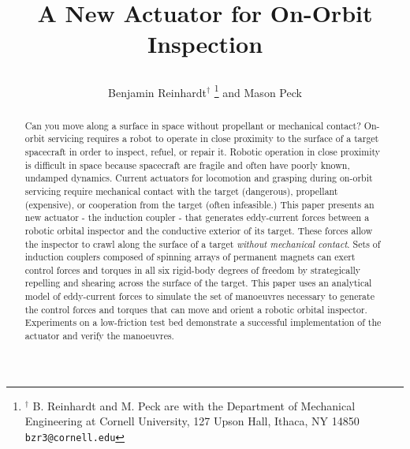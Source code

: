 \documentclass[letterpaper, 10 pt, conference]{ieeeconf}  %
\title{\LARGE \bf



A New Actuator for On-Orbit Inspection 

}
\author{Benjamin Reinhardt$^{\dag}$ 
\thanks{$^{\dag}$ B. Reinhardt and M. Peck are with the Department of Mechanical Engineering at Cornell University, 127 Upson Hall, Ithaca, NY 14850 {\tt\small bzr3@cornell.edu}}%
and Mason Peck%
}
\begin{document}
\maketitle
\thispagestyle{empty}
\pagestyle{empty}


\begin{abstract}

Can you move along a surface in space without propellant or mechanical contact? On-orbit servicing requires a robot to operate in close proximity to the surface of a target spacecraft in order to inspect, refuel, or repair it.  Robotic operation in close proximity is difficult in space because spacecraft are fragile and often have poorly known, undamped dynamics. Current actuators for locomotion and grasping during on-orbit servicing require mechanical contact with the target (dangerous), propellant (expensive), or cooperation from the target (often infeasible.)   
%
This paper presents an new actuator - the induction coupler - that generates eddy-current forces between a robotic orbital inspector and the conductive exterior of its target. These forces allow the inspector to crawl along the surface of a target \textit{without mechanical contact}. Sets of induction couplers composed of spinning arrays of permanent magnets can exert control forces and torques in all six rigid-body degrees of freedom by strategically repelling and shearing across the surface of the target. 
%
This paper uses an analytical model of eddy-current forces to simulate the set of manoeuvres necessary to generate the control forces and torques that can move and orient a robotic orbital inspector. Experiments on a low-friction test bed demonstrate a successful implementation of the actuator and verify the manoeuvres.

\end{abstract}


\listoftodos
\end{document}
